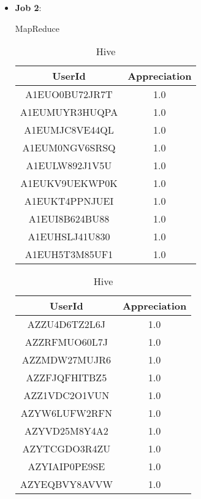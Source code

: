\begin{itemize}
    \item \textbf{Job 2}:
    \begin{table}[!ht]
      \centering
      \begin{minipage}{.5\textwidth}
        \centering
        \caption{MapReduce}
        \begin{tabular}{cc}
          \toprule
          UserId & Appreciation \\
          \midrule
            A1EUO0BU72JR7T & 1.0 \\
            A1EUMUYR3HUQPA & 1.0 \\
            A1EUMJC8VE44QL & 1.0 \\
            A1EUM0NGV6SRSQ & 1.0 \\
            A1EULW892J1V5U & 1.0 \\
            A1EUKV9UEKWP0K & 1.0 \\
            A1EUKT4PPNJUEI & 1.0 \\
            A1EUI8B624BU88 & 1.0 \\
            A1EUHSLJ41U830 & 1.0 \\
            A1EUH5T3M85UF1 & 1.0 \\
          \bottomrule
        \end{tabular}
      \end{minipage}%
      \begin{minipage}{.5\textwidth}
        \centering
        \caption{Hive}
        \begin{tabular}{cc}
          \toprule
          UserId & Appreciation \\
          \midrule
              AZZU4D6TZ2L6J & 1.0 \\
              AZZRFMUO60L7J & 1.0 \\
              AZZMDW27MUJR6 & 1.0 \\
              AZZFJQFHITBZ5 & 1.0 \\
              AZZ1VDC2O1VUN & 1.0 \\
              AZYW6LUFW2RFN & 1.0 \\
              AZYVD25M8Y4A2 & 1.0 \\
              AZYTCGDO3R4ZU & 1.0 \\
              AZYIAIP0PE9SE & 1.0 \\
              AZYEQBVY8AVVW & 1.0 \\
          \bottomrule
        \end{tabular}
      \end{minipage}
    \end{table}

\end{itemize}
